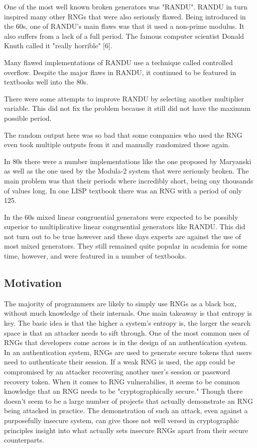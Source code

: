 \documentclass{article}
\begin{document}
    One of the most well known broken generators was "RANDU". RANDU in turn
    inspired many other RNGs that were also seriously flawed.
    Being introduced in the 60s, one of RANDU's main flaws
    was that it used a non-prime modulus. It also suffers from a lack
    of a full period. The famous computer scientist Donald Knuth called it "really horrible" [6].

    Many flawed implementations of RANDU use a technique called controlled overflow.
    Despite the major flaws in RANDU, it continued to be featured in textbooks well
    into the 80s.

    There were some attempts to improve RANDU by selecting another multiplier variable.
    This did not fix the problem because it still did not have the maximum possible period.

    The random output here was so bad that some companies who used the RNG even
    took multiple outputs from it and manually randomized those again.

    In 80s there were a number implementations like the one proposed by Maryanski as well
    as the one used by the Modula-2 system that were seriously broken.
    The main problem was that their periods where incredibly short, being ony thousands
    of values long. In one LISP textbook there was an RNG with a period of only 125.

    In the 60s mixed linear congruential generators were expected to be possibly
    superior to multiplicative linear congruential generators like RANDU.
    This did not turn out to be true however and these days experts are against the
    use of most mixed generators.
    They still remained quite popular in academia for some time, however, and were
    featured in a number of textbooks.

    \subsection{Motivation}

    The majority of programmers are likely to simply use RNGs as a black box,
    without much knowledge of their internals. One main takeaway
    is that entropy is key. The basic idea is that the higher a system's entropy is,
    the larger the search space is that an attacker needs to sift through.
    One of the most common uses of RNGs that developers come across
    is in the design of an authentication system.
    In an authentication system, RNGs are used to generate secure tokens that users need to
    authenticate their session.
    If a weak RNG is used, the app could be compromised by an attacker recovering another user's session
    or password recovery token.
    When it comes to RNG vulnerabilies, it seems to be common knowledge that an RNG
    needs to be "cryptographically secure." Though there doesn't seem to be a large
    number of projects that actually demonstrate an RNG being attacked in practice.
    The demonstration of such an attack, even against a purposefully insecure system,
    can give those not well versed in cryptographic principles insight into what actually
    sets insecure RNGs apart from their secure counterparts.
    
\end{document}
